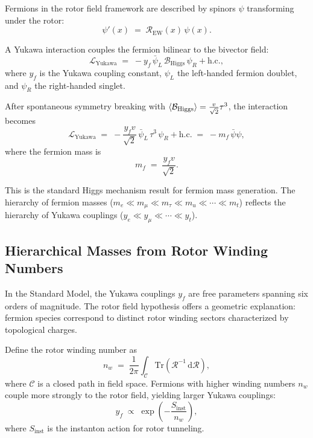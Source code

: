 \documentclass[11pt,a4paper]{article}
\newcommand{\Rotor}{\mathcal{R}}
\newcommand{\Biv}{\mathcal{B}}
\newcommand{\Lag}{\mathcal{L}}
\theoremstyle{definition}
\theoremstyle{plain}
\theoremstyle{remark}
\begin{document}
Fermions in the rotor field framework are described by spinors $\psi$ transforming under the rotor:
\begin{equation}
  \psi'(x) \;=\; \Rotor_{\text{EW}}(x)\,\psi(x).
\end{equation}

A Yukawa interaction couples the fermion bilinear to the bivector field:
\begin{equation}
  \Lag_{\text{Yukawa}} \;=\; -y_f\, \bar{\psi}_L\, \Biv_{\text{Higgs}}\, \psi_R + \text{h.c.},
  \label{eq:yukawa}
\end{equation}
where $y_f$ is the Yukawa coupling constant, $\psi_L$ the left-handed fermion doublet, and $\psi_R$ the right-handed singlet.

After spontaneous symmetry breaking with $\ev{\Biv_{\text{Higgs}}} = \frac{v}{\sqrt{2}}\tau^3$, the interaction becomes
\begin{equation}
  \Lag_{\text{Yukawa}} \;=\; -\frac{y_f v}{\sqrt{2}}\,\bar{\psi}_L\,\tau^3\,\psi_R + \text{h.c.}
  \;=\; -m_f\,\bar{\psi}\psi,
\end{equation}
where the fermion mass is
\begin{equation}
  \boxed{m_f \;=\; \frac{y_f v}{\sqrt{2}}.}
  \label{eq:fermion-mass}
\end{equation}

This is the standard Higgs mechanism result for fermion mass generation. The hierarchy of fermion masses ($m_e \ll m_\mu \ll m_\tau \ll m_u \ll \cdots \ll m_t$) reflects the hierarchy of Yukawa couplings ($y_e \ll y_\mu \ll \cdots \ll y_t$).

\subsection{Hierarchical Masses from Rotor Winding Numbers}

In the Standard Model, the Yukawa couplings $y_f$ are free parameters spanning six orders of magnitude. The rotor field hypothesis offers a geometric explanation: fermion species correspond to distinct rotor winding sectors characterized by topological charges.

Define the rotor winding number as
\begin{equation}
  n_w \;=\; \frac{1}{2\pi}\int_{\mathcal{C}} \mathrm{Tr}\left(\Rotor^{-1}\,\mathrm{d}\Rotor\right),
\end{equation}
where $\mathcal{C}$ is a closed path in field space. Fermions with higher winding numbers $n_w$ couple more strongly to the rotor field, yielding larger Yukawa couplings:
\begin{equation}
  y_f \;\propto\; \exp\!\left(-\frac{S_{\text{inst}}}{n_w}\right),
\end{equation}
where $S_{\text{inst}}$ is the instanton action for rotor tunneling.
\end{document}
